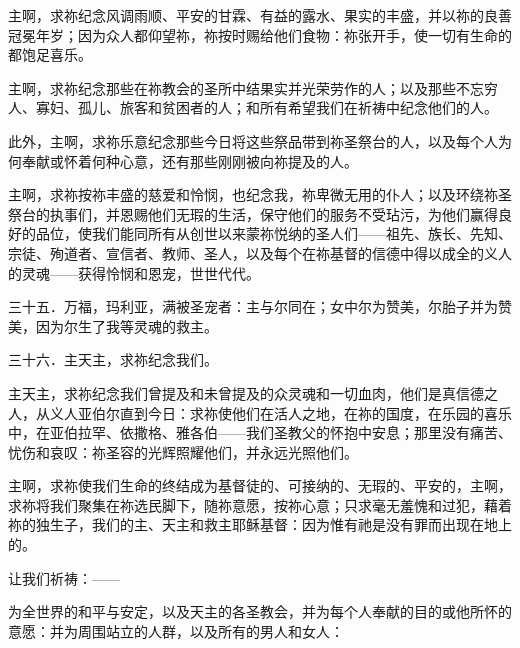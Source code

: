 主啊，求祢纪念风调雨顺、平安的甘霖、有益的露水、果实的丰盛，并以祢的良善冠冕年岁；因为众人都仰望祢，祢按时赐给他们食物：祢张开手，使一切有生命的都饱足喜乐。\par

主啊，求祢纪念那些在祢教会的圣所中结果实并光荣劳作的人；以及那些不忘穷人、寡妇、孤儿、旅客和贫困者的人；和所有希望我们在祈祷中纪念他们的人。\par

此外，主啊，求祢乐意纪念那些今日将这些祭品带到祢圣祭台的人，以及每个人为何奉献或怀着何种心意，还有那些刚刚被向祢提及的人。\par

主啊，求祢按祢丰盛的慈爱和怜悯，也纪念我，祢卑微无用的仆人；以及环绕祢圣祭台的执事们，并恩赐他们无瑕的生活，保守他们的服务不受玷污，为他们赢得良好的品位，使我们能同所有从创世以来蒙祢悦纳的圣人们——祖先、族长、先知、宗徒、殉道者、宣信者、教师、圣人，以及每个在祢基督的信德中得以成全的义人的灵魂——获得怜悯和恩宠，世世代代。\par

三十五．万福，玛利亚，满被圣宠者：主与尔同在；女中尔为赞美，尔胎子并为赞美，因为尔生了我等灵魂的救主。\par

\par

三十六．主天主，求祢纪念我们。\par

\par

主天主，求祢纪念我们曾提及和未曾提及的众灵魂和一切血肉，他们是真信德之人，从义人亚伯尔直到今日：求祢使他们在活人之地，在祢的国度，在乐园的喜乐中，在亚伯拉罕、依撒格、雅各伯——我们圣教父的怀抱中安息；那里没有痛苦、忧伤和哀叹：祢圣容的光辉照耀他们，并永远光照他们。\par

主啊，求祢使我们生命的终结成为基督徒的、可接纳的、无瑕的、平安的，主啊，求祢将我们聚集在祢选民脚下，随祢意愿，按祢心意；只求毫无羞愧和过犯，藉着祢的独生子，我们的主、天主和救主耶稣基督：因为惟有祂是没有罪而出现在地上的。\par

\par

让我们祈祷：——\par

为全世界的和平与安定，以及天主的各圣教会，并为每个人奉献的目的或他所怀的意愿：并为周围站立的人群，以及所有的男人和女人：\par

